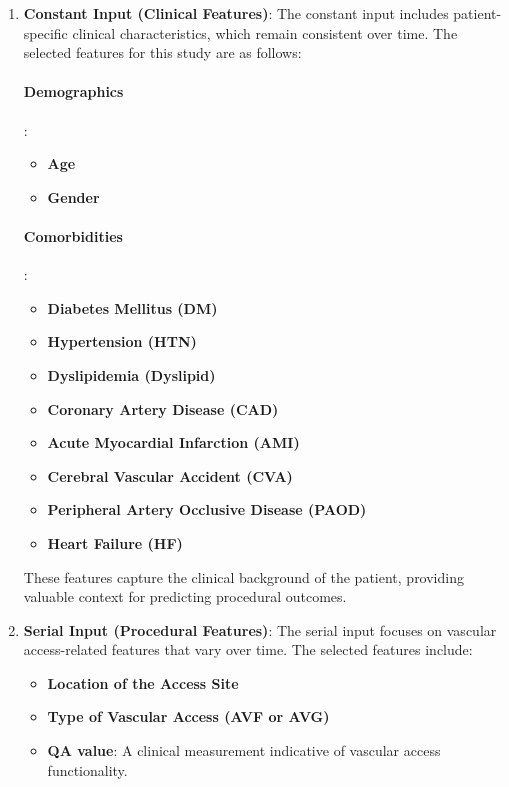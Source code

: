 \begin{enumerate}
  \item \textbf{Constant Input (Clinical Features)}: The constant input includes patient-specific clinical characteristics, which remain consistent over time. The selected features for this study are as follows:
  \paragraph{Demographics}:
  \begin{itemize}
    \item \textbf{Age}
    \item \textbf{Gender}
  \end{itemize}
  \paragraph{Comorbidities}:
    \begin{itemize}
    \item \textbf{Diabetes Mellitus (DM)}
    \item \textbf{Hypertension (HTN)}
    \item \textbf{Dyslipidemia (Dyslipid)}
    \item \textbf{Coronary Artery Disease (CAD)}
    \item \textbf{Acute Myocardial Infarction (AMI)}
    \item \textbf{Cerebral Vascular Accident (CVA)}
    \item \textbf{Peripheral Artery Occlusive Disease (PAOD)}
    \item \textbf{Heart Failure (HF)}
  \end{itemize}
  
  These features capture the clinical background of the patient, providing valuable context for predicting procedural outcomes.
  \item \textbf{Serial Input (Procedural Features)}: The serial input focuses on vascular access-related features that vary over time. The selected features include:
  \begin{itemize}
    \item \textbf{Location of the Access Site}
    \item \textbf{Type of Vascular Access (AVF or AVG)}
    \item \textbf{QA value}: A clinical measurement indicative of vascular access functionality.
  \end{itemize}
\end{enumerate}

